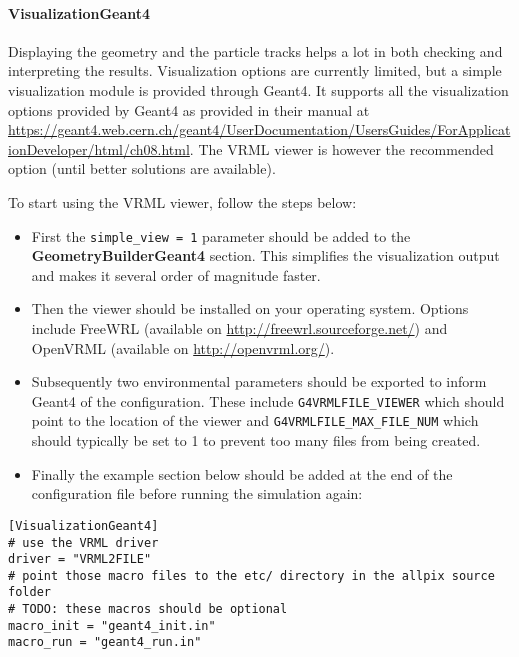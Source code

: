 \paragraph{VisualizationGeant4}
Displaying the geometry and the particle tracks helps a lot in both checking and interpreting the results. Visualization options are currently limited, but a simple visualization module is provided through Geant4. It supports all the visualization options provided by Geant4 as provided in their manual at \url{https://geant4.web.cern.ch/geant4/UserDocumentation/UsersGuides/ForApplicationDeveloper/html/ch08.html}. The VRML viewer is however the recommended option (until better solutions are available). 

To start using the VRML viewer, follow the steps below:
\begin{itemize}
\item First the \texttt{simple\_view = 1} parameter should be added to the \textbf{GeometryBuilderGeant4} section. This simplifies the visualization output and makes it several order of magnitude faster. 
\item Then the viewer should be installed on your operating system. Options include FreeWRL (available on \url{http://freewrl.sourceforge.net/}) and OpenVRML (available on \url{http://openvrml.org/}).
\item Subsequently two environmental parameters should be exported to inform Geant4 of the configuration. These include \texttt{G4VRMLFILE\_VIEWER} which should point to the location of the viewer and \texttt{G4VRMLFILE\_MAX\_FILE\_NUM} which should typically be set to 1 to prevent too many files from being created.
\item Finally the example section below should be added at the end of the configuration file before running the simulation again:
\end{itemize}

\begin{verbatim}
[VisualizationGeant4]
# use the VRML driver
driver = "VRML2FILE" 
# point those macro files to the etc/ directory in the allpix source folder
# TODO: these macros should be optional
macro_init = "geant4_init.in"
macro_run = "geant4_run.in"
\end{verbatim}


